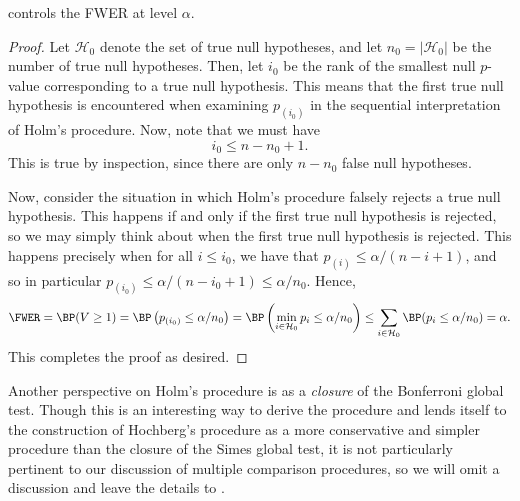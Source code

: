 \documentclass[11pt,reqno]{report}
\theoremstyle{definition}
\numberwithin{equation}{section}
\begin{document}
\begin{prop}
 controls the FWER at level $\alpha$.
\end{prop}
\begin{proof}
Let $\mathcal{H}_0$ denote the set of true null hypotheses, and let $n_0 = |\mathcal{H}_0|$ be the number of true null hypotheses. Then, let $i_0$ be the rank of the smallest null $p$-value corresponding to a true null hypothesis. This means that the first true null hypothesis is encountered when examining $p_{(i_0)}$ in the sequential interpretation of Holm's procedure. Now, note that we must have
\[ i_0 \leq n - n_0 + 1. \] This is true by inspection, since there are only $n - n_0$ false null hypotheses.

Now, consider the situation in which Holm's procedure falsely rejects a true null hypothesis. This happens if and only if the first true null hypothesis is rejected, so we may simply think about when the first true null hypothesis is rejected. This happens precisely when for all $i \leq i_0$, we have that $p_{(i)} \leq \alpha / (n - i + 1)$, and so in particular $p_{(i_0)} \leq \alpha / (n - i_0 + 1) \leq \alpha / n_0$. Hence,
\[ \FWER = \BP(V \geq 1) = \BP\left( p_{(i_0)} \leq \alpha / n_0 \right) = \BP\left( \min_{i \in \mathcal{H}_0} p_{i} \leq \alpha / n_0 \right) \leq \sum_{i \in \mathcal{H}_0} \BP(p_{i} \leq \alpha / n_0)  = \alpha. \]
This completes the proof as desired.
\end{proof}

\begin{note*}
Another perspective on Holm's procedure is as a \emph{closure} of the Bonferroni global test. Though this is an interesting way to derive the procedure and lends itself to the construction of Hochberg's procedure as a more conservative and simpler procedure than the closure of the Simes global test, it is not particularly pertinent to our discussion of multiple comparison procedures, so we will omit a discussion and leave the details to \cite{stat300}.
\end{note*}
\end{document}
